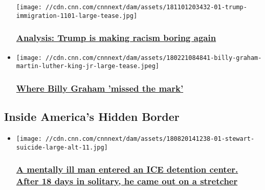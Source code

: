 \begin{itemize}
  \texttt{[image: //cdn.cnn.com/cnnnext/dam/assets/181101203432-01-trump-immigration-1101-large-tease.jpg]}

  \hypertarget{analysis-trump-is-making-racism-boring-again}{%
  \subsubsection{\texorpdfstring{\href{/2018/11/01/politics/trump-ad-blake-analysis/index.html}{Analysis:
  Trump is making racism boring
  again}}{Analysis: Trump is making racism boring again}}\label{analysis-trump-is-making-racism-boring-again}}
\item
  \href{/2018/02/22/us/billy-graham-mlk-civil-rights/index.html}{}

  \texttt{[image: //cdn.cnn.com/cnnnext/dam/assets/180221084841-billy-graham-martin-luther-king-jr-large-tease.jpeg]}

  \hypertarget{where-billy-graham-missed-the-mark}{%
  \subsubsection{\texorpdfstring{\href{/2018/02/22/us/billy-graham-mlk-civil-rights/index.html}{Where
  Billy Graham 'missed the
  mark'}}{Where Billy Graham 'missed the mark'}}\label{where-billy-graham-missed-the-mark}}
\end{itemize}

\hypertarget{inside-americas-hidden-border-}{%
\subsection{Inside America's Hidden
Border~}\label{inside-americas-hidden-border-}}

\begin{itemize}
\item
  \href{http://www.cnn.com/interactive/2018/08/us/ice-detention-stewart-georgia/?utm_content=chapter_01}{}

  \texttt{[image: //cdn.cnn.com/cnnnext/dam/assets/180820141238-01-stewart-suicide-large-alt-11.jpg]}

  \hypertarget{a-mentally-ill-man-entered-an-ice-detention-center-after-18-days-in-solitary-he-came-out-on-a-stretcher}{%
  \subsubsection{\texorpdfstring{\href{http://www.cnn.com/interactive/2018/08/us/ice-detention-stewart-georgia/?utm_content=chapter_01}{A
  mentally ill man entered an ICE detention center. After 18 days in
  solitary, he came out on a
  stretcher}}{A mentally ill man entered an ICE detention center. After 18 days in solitary, he came out on a stretcher}}\label{a-mentally-ill-man-entered-an-ice-detention-center-after-18-days-in-solitary-he-came-out-on-a-stretcher}}
\end{itemize}

